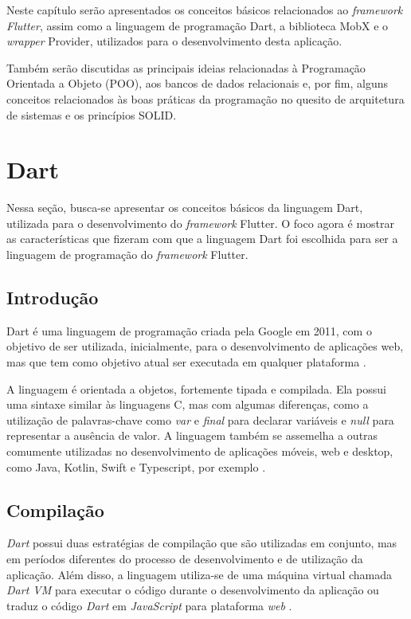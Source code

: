 
\label{Cap:Teoria}

Neste capítulo serão apresentados os conceitos básicos relacionados ao \textit{framework Flutter}, assim como a linguagem de programação Dart, a biblioteca MobX e o \textit{wrapper} Provider, utilizados para o desenvolvimento desta aplicação.

Também serão discutidas as principais ideias relacionadas à Programação Orientada a Objeto (POO), aos bancos de dados relacionais e, por fim, alguns conceitos relacionados às boas práticas da programação no quesito de arquitetura de sistemas e os princípios SOLID.

\section{Dart}
\label{cap2:Sec:Dart}

Nessa seção, busca-se apresentar os conceitos básicos da linguagem Dart, utilizada para o desenvolvimento do \textit{framework} Flutter. O foco agora é mostrar as características que fizeram com que a linguagem Dart foi escolhida para ser a linguagem de programação do \textit{framework} Flutter.

\subsection{Introdução}
\label{cap2:SubSec:Introducao}

Dart \cite{dart} é uma linguagem de programação criada pela Google em 2011, com o objetivo de ser utilizada, inicialmente, para o desenvolvimento de aplicações web, mas que tem como objetivo atual ser executada em qualquer plataforma \cite{bak2011dart} \cite{dart-platforms}.

A linguagem é orientada a objetos, fortemente tipada e compilada. Ela possui uma sintaxe similar às linguagens C, mas com algumas diferenças, como a utilização de palavras-chave como \textit{var} e \textit{final} para declarar variáveis e \textit{null} para representar a ausência de valor. A linguagem também se assemelha a outras comumente utilizadas no desenvolvimento de aplicações móveis, web e desktop, como Java, Kotlin, Swift e Typescript, por exemplo \cite{dart} \cite{dart-language}.


\subsection{Compilação}
\label{cap2:SubSec:Compilacao}
\textit{Dart} possui duas estratégias de compilação que são utilizadas em conjunto, mas em períodos diferentes do processo de desenvolvimento e de utilização da aplicação. Além disso, a linguagem utiliza-se de uma máquina virtual chamada \textit{Dart VM} para executar o código durante o desenvolvimento da aplicação ou traduz o código \textit{Dart} em \textit{JavaScript} para plataforma \textit{web} \cite{dart-platforms}.


